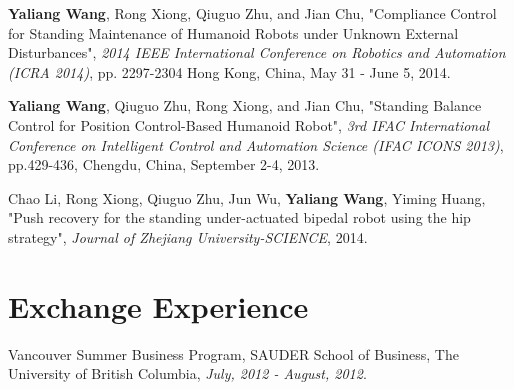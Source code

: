 \documentclass[letterpaper,8pt]{extarticle}
\newlength{\wideitemsep}
\let\olditem\item
\renewcommand{\item}{\setlength{\itemsep}{\wideitemsep}\olditem}
\def\footerlink{}
\renewenvironment{itemize}{
  \begin{list}{}{
    \setlength{\leftmargin}{1.5em}
  }
}{
  \end{list}
}
\begin{document}
\begin{itemize}
\item[$\circ$] \textbf{Yaliang Wang}, Rong Xiong, Qiuguo Zhu, and Jian Chu, 
  "Compliance Control for Standing Maintenance of Humanoid Robots under Unknown External Disturbances",
  {\it 2014 IEEE International Conference on Robotics and Automation (ICRA 2014)}, pp. 2297-2304
  Hong Kong, China, May 31 - June 5, 2014.
\item[$\circ$] \textbf{Yaliang Wang}, Qiuguo Zhu, Rong Xiong, and Jian Chu, 
  "Standing Balance Control for Position Control-Based Humanoid Robot",
  {\it 3rd IFAC International Conference on Intelligent Control and Automation Science (IFAC ICONS 2013)}, pp.429-436, Chengdu, China, September 2-4, 2013.
\item[$\circ$] Chao Li, Rong Xiong, Qiuguo Zhu, Jun Wu, \textbf{Yaliang Wang}, Yiming Huang, "Push recovery for the standing under-actuated bipedal robot using the hip strategy", {\it Journal of Zhejiang University-SCIENCE}, 2014.
\end{itemize}



\section*{Exchange Experience \noindent\hrulefill}

\begin{itemize}
  \item[$\circ$] Vancouver Summer Business Program, 
   SAUDER School of Business, The University of British Columbia, {\it  July, 2012 - August, 2012}.
\end{itemize}





\end{document}
